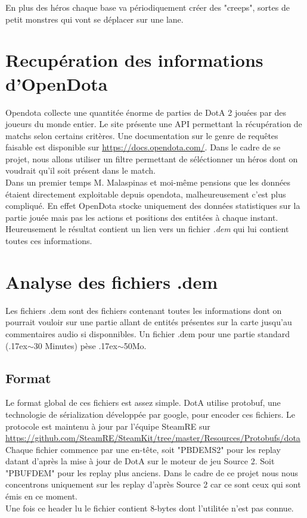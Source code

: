 \documentclass{article}
\begin{document}
En plus des héros chaque base va périodiquement créer des "creeps", sortes de petit monstres qui vont se déplacer sur une lane.

\section{Recupération des informations d'OpenDota}

Opendota collecte une quantitée énorme de parties de DotA 2 jouées par des joueurs du monde entier. Le site présente une API permettant la récupération de matchs selon certains critères. Une documentation sur le genre de requêtes faisable est disponible sur \url{https://docs.opendota.com/}. Dans le cadre de se projet, nous allons utiliser un filtre permettant de séléctionner un héros dont on voudrait qu'il soit présent dans le match.\\
Dans un premier temps M. Malaspinas et moi-même pensions que les données étaient directement exploitable depuis opendota, malheureusement c'est plus compliqué. En effet OpenDota stocke uniquement des données statistiques sur la partie jouée mais pas les actions et positions des entitées à chaque instant. Heureusement le résultat contient un lien vers un fichier \textit{.dem} qui lui contient toutes ces informations.

\section{Analyse des fichiers .dem}

Les fichiers .dem sont des fichiers contenant toutes les informations dont on pourrait vouloir sur une partie allant de entités présentes sur la carte jusqu'au commentaires audio si disponnibles. Un fichier .dem pour une partie standard ({\raise.17ex\hbox{$\scriptstyle\mathtt{\sim}$}}30 Minutes) pèse {\raise.17ex\hbox{$\scriptstyle\mathtt{\sim}$}}50Mo.

\subsection{Format}

Le format global de ces fichiers est assez simple. DotA utilise protobuf, une technologie de sérialization développée par google, pour encoder ces fichiers. Le protocole est maintenu à jour par l'équipe SteamRE sur \url{https://github.com/SteamRE/SteamKit/tree/master/Resources/Protobufs/dota} \\
Chaque fichier commence par une en-tête, soit "PBDEMS2" pour les replay datant d'après la mise à jour de DotA sur le moteur de jeu Source 2. Soit "PBUFDEM" pour les replay plus anciens. Dans le cadre de ce projet nous nous concentrons uniquement sur les replay d'après Source 2 car ce sont ceux qui sont émis en ce moment.\\
Une fois ce header lu le fichier contient 8-bytes dont l'utilitée n'est pas connue.\\
\end{document}
